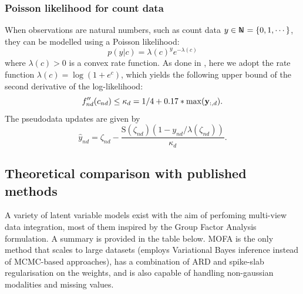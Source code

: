 \subsubsection*{Poisson likelihood for count data}

When observations are natural numbers, such as count data $y \in \N = \{0,1,\cdots\}$, they can be modelled using a Poisson likelihood:
\begin{equation*}
	p(y|c) = \lambda(c)^y e^{-\lambda(c)}
\end{equation*}
where $\lambda(c)>0$ is a convex rate function. As done in \cite{Seeger2012}, here we adopt the rate function $\lambda(c)=\log(1+e^c)$, which yields the following upper bound of the second derivative of the log-likelihood:
\begin{equation*}
	f''_{nd}(c_{nd}) \leq \kappa_d = 1/4 + 0.17*\max({\bf y}_{:,d}).
\end{equation*}
The pseudodata updates are given by
\begin{equation*}
	\hat{y}_{nd} = \zeta_{nd} - \frac{\mathrm{S}(\zeta_{nd})(1-y_{nd}/\lambda(\zeta_{nd}))}{\kappa_d}.
\end{equation*}

\pagebreak
	 
\subsection{Theoretical comparison with published methods}

A variety of latent variable models exist with the aim of perfoming multi-view data integration, most of them inspired by the Group Factor Analysis formulation. A summary is provided in the table below. MOFA is the only method that scales to large datasets (employs Variational Bayes inference instead of MCMC-based approaches), has a combination of ARD and spike-slab regularisation on the weights, and is also capable of handling non-gaussian modalities and missing values.

